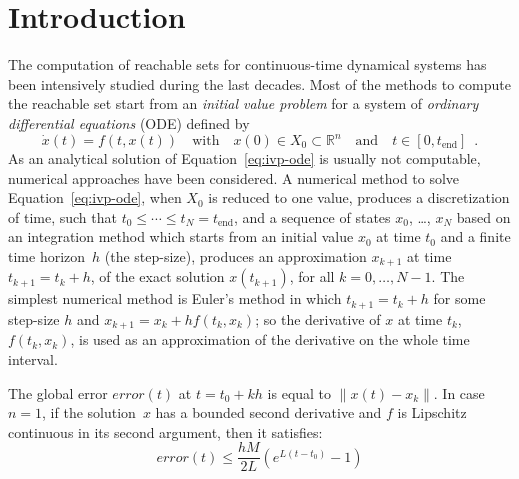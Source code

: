
\graphicspath{{part_4/figures}{part_4/figures/}}

\section{Introduction}


The computation of reachable sets for continuous-time dynamical
systems has been intensively studied during the last decades.
Most of the methods
to compute the reachable set start from an \textit{initial value
  problem} for a system of \textit{ordinary differential equations} (ODE) defined
by
\begin{equation}
  \label{eq:ivp-ode}
  \dot{x}(t)=f(t,x(t))
  \quad\text{with}\quad x(0)\in X_0 \subset \mathbb{R}^n
  \quad\text{and}\quad t\in[0,t_{\text{end}}]\enspace.
\end{equation}
As an analytical solution of
Equation~\eqref{eq:ivp-ode} is usually not computable, numerical
approaches have been considered.
%
A numerical method to solve Equation~\eqref{eq:ivp-ode}, when $X_0$ is
reduced to one value, produces a discretization of time, such that
$t_0 \leqslant \cdots \leqslant t_N = t_{\text{end}}$, and a sequence
of states $x_0$, \dots, $x_{N}$ based on an integration method
which starts from an initial value $x_0$ at time
$t_0$ and a finite time horizon~$h$ (the step-size), produces an
approximation $x_{k+1}$ at time $t_{k+1} = t_k + h$, of the exact
solution $x(t_{k+1})$,
for all $k = 0,\dots,N-1$. The simplest numerical
method is Euler's method in which $t_{k+1} = t_k + h$ for some
step-size $h$ and $x_{k+1} = x_k + h f(t_k,x_k)$; so the derivative of
$x$ at time $t_k$, $f(t_k, x_k)$, is used as an approximation of the
derivative on the whole time interval.



The global error $error(t)$ at $t=t_0+kh$ is equal to
$\|x(t) -x_{k}\|$.  In case $n=1$, if the solution~$x$  has a bounded second derivative and $f$ is Lipschitz continuous in its second argument, then it
 satisfies:
\begin{equation}\label{eqn:error}
    error(t) \leq {\frac {hM}{2L}}(e^{L(t-t_{0})}-1)
  \end{equation}


